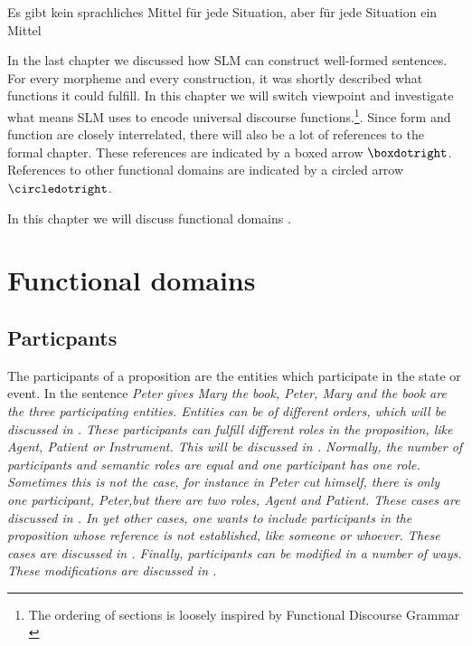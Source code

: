 


\begin{motto}
Es gibt kein sprachliches Mittel f\"ur jede Situation, aber f\"ur  jede Situation ein Mittel\citep[202]{Keller1990}
\end{motto}


In the last chapter we discussed how SLM can construct well-formed sentences. For every morpheme and every construction, it was shortly described what functions it could fulfill. In this chapter we will switch viewpoint and investigate what means SLM uses to encode universal discourse functions.\footnote{The ordering of sections is loosely inspired by Functional Discourse Grammar \citep{HengeveldEtAl2008fdg}}. Since form and function are closely interrelated, there will also be a lot of references to the formal chapter. These references are indicated by a boxed arrow $\boxdotright$. References to other functional domains are indicated by a circled arrow $\circledotright$.

In this chapter we will discuss  functional domains  \citep{Givon2001a,Givon2001b}.

\chapter{Functional domains}\label{sec:func:FunctionalDomains}

\section{Particpants}\label{sec:func:Particpants}
The participants of a proposition are the entities which participate in the state or event. In the sentence \em Peter gives Mary the book\em, \em Peter, Mary \em and \em the book \em are the three participating entities. Entities can be of different orders, which will be discussed in . These participants can fulfill different roles in the proposition, like Agent, Patient or Instrument. This will be discussed in . Normally, the number of participants and semantic roles are equal and one participant has one role. Sometimes this is not the case, for instance in \em Peter cut himself\em, there is only one participant, \em Peter,\em but there are two roles, Agent and Patient. These cases are discussed in . In yet other cases, one wants to include participants in the proposition whose reference is not established, like \em someone \em or \em whoever\em. These cases are discussed in . Finally, participants can be modified in a number of ways. These modifications are discussed in .

